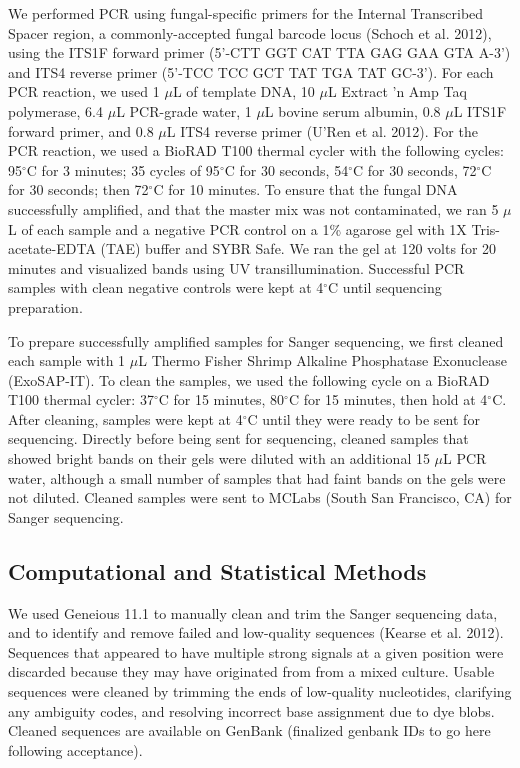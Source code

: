 \documentclass[fleqn,10pt,lineno]{wlpeerj} %
\begin{document}
We performed PCR using fungal-specific primers for the Internal Transcribed Spacer region, a commonly-accepted fungal barcode locus (Schoch et al. 2012), using the ITS1F forward primer (5'-CTT GGT CAT TTA GAG GAA GTA A-3') and ITS4 reverse primer (5'-TCC TCC GCT TAT TGA TAT GC-3'). For each PCR reaction, we used 1 \(\mu\)L of template DNA, 10 \(\mu\)L Extract 'n Amp Taq polymerase, 6.4 \(\mu\)L PCR-grade water, 1 \(\mu\)L bovine serum albumin, 0.8 \(\mu\)L ITS1F forward primer, and 0.8 \(\mu\)L ITS4 reverse primer (U'Ren et al. 2012). For the PCR reaction, we used a BioRAD T100 thermal cycler with the following cycles: 95\(^{\circ}\)C for 3 minutes; 35 cycles of 95\(^{\circ}\)C for 30 seconds, 54\(^{\circ}\)C for 30 seconds, 72\(^{\circ}\)C for 30 seconds; then 72\(^{\circ}\)C for 10 minutes. To ensure that the fungal DNA successfully amplified, and that the master mix was not contaminated, we ran 5 \(\mu\)L of each sample and a negative PCR control on a 1\% agarose gel with 1X Tris-acetate-EDTA (TAE) buffer and SYBR Safe. We ran the gel at 120 volts for 20 minutes and visualized bands using UV transillumination. Successful PCR samples with clean negative controls were kept at 4\(^{\circ}\)C until sequencing preparation.

To prepare successfully amplified samples for Sanger sequencing, we first cleaned each sample with 1 \(\mu\)L Thermo Fisher Shrimp Alkaline Phosphatase Exonuclease (ExoSAP-IT). To clean the samples, we used the following cycle on a BioRAD T100 thermal cycler: 37\(^{\circ}\)C for 15 minutes, 80\(^{\circ}\)C for 15 minutes, then hold at 4\(^{\circ}\)C. After cleaning, samples were kept at 4\(^{\circ}\)C until they were ready to be sent for sequencing. Directly before being sent for sequencing, cleaned samples that showed bright bands on their gels were diluted with an additional 15 \(\mu\)L PCR water, although a small number of samples that had faint bands on the gels were not diluted. Cleaned samples were sent to MCLabs (South San Francisco, CA) for Sanger sequencing.

\hypertarget{computational-and-statistical-methods}{%
\subsection*{Computational and Statistical Methods}\label{computational-and-statistical-methods}}

We used Geneious 11.1 to manually clean and trim the Sanger sequencing data, and to identify and remove failed and low-quality sequences (Kearse et al. 2012). Sequences that appeared to have multiple strong signals at a given position were discarded because they may have originated from from a mixed culture. Usable sequences were cleaned by trimming the ends of low-quality nucleotides, clarifying any ambiguity codes, and resolving incorrect base assignment due to dye blobs. Cleaned sequences are available on GenBank (finalized genbank IDs to go here following acceptance).
\end{document}
